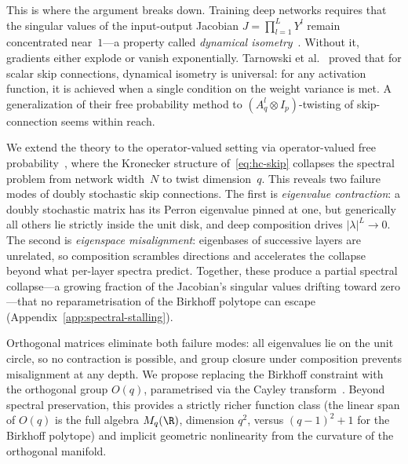 This is where the argument breaks down.\label{sec:spectral-failure} Training deep networks requires that the singular values of the input-output Jacobian $J = \prod_{l=1}^{L} Y^l$ remain concentrated near~$1$---a property called \emph{dynamical isometry}~\cite{saxe2014exact,pennington2017resurrecting}. Without it, gradients either explode or vanish exponentially. Tarnowski et al.~\cite{tarnowski2019dynamical} proved that for scalar skip connections, dynamical isometry is universal: for any activation function, it is achieved when a single condition on the weight variance is met. A generalization of their free probability method to $(A_q^l \otimes I_p)$-twisting of skip-connection seems within reach.  

We extend the theory to the operator-valued setting via operator-valued free probability~\cite{voiculescu1995operations,dykema2006multilinear}, where the Kronecker structure of~\eqref{eq:hc-skip} collapses the spectral problem from network width~$N$ to twist dimension~$q$. This reveals two failure modes of doubly stochastic skip connections. The first is \emph{eigenvalue contraction}: a doubly stochastic matrix has its Perron eigenvalue pinned at one, but generically all others lie strictly inside the unit disk, and deep composition drives $|\lambda|^L \to 0$. The second is \emph{eigenspace misalignment}: eigenbases of successive layers are unrelated, so composition scrambles directions and accelerates the collapse beyond what per-layer spectra predict. Together, these produce a partial spectral collapse---a growing fraction of the Jacobian's singular values drifting toward zero---that no reparametrisation of the Birkhoff polytope can escape (Appendix~\ref{app:spectral-stalling}).

Orthogonal matrices eliminate both failure modes: all eigenvalues lie on the unit circle, so no contraction is possible, and group closure under composition prevents misalignment at any depth. We propose replacing the Birkhoff constraint with the orthogonal group $O(q)$, parametrised via the Cayley transform~\cite{li2020cayley}. Beyond spectral preservation, this provides a strictly richer function class (the linear span of $O(q)$ is the full algebra $M_q(\R)$, dimension $q^2$, versus $(q{-}1)^2 + 1$ for the Birkhoff polytope) and implicit geometric nonlinearity from the curvature of the orthogonal manifold.

